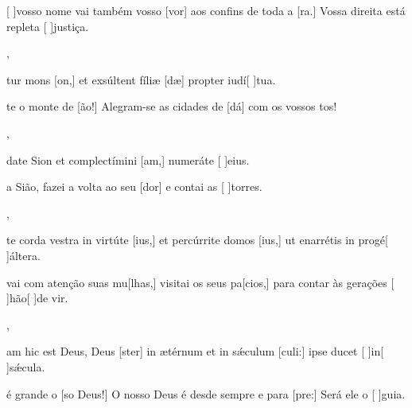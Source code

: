 {        {\item {}[ ]{vos}so nome vai também vosso [vor] aos confins de toda a [ra.] Vossa direita está repleta [ ]{jus}{ti}ça.},
    {\item {}tur mons [on,] et exsúltent fíliæ [dæ] propter iudí[ ]{tu}a.}%
        {\item {}te o monte de [ão!] Alegram-se as cida\-des de [dá] com os vossos tos!},
    {\item {}date Sion et complectímini [am,] numeráte [ ]{e}ius.}%
        {\item {} a Sião, fazei a volta ao seu [dor] e contai as [ ]{tor}res.},
    {\item {}te corda vestra in virtúte [ius,] et percúrrite domos [ius,] ut enarrétis in progé[ ]{ál}tera.}%
        {\item {}vai com atenção suas mu[lhas,] visitai os seus pa[cios,] para contar às gerações [ ]{hão}[ ]{de} vir.},
    {\item {}am hic est Deus, Deus [ster] in ætérnum et in sǽculum [culi:] ipse ducet [ ]{in}[ ]{sǽ}cula.}%
        {\item {} é grande o [so Deus!] O nosso Deus é desde sempre e para [pre:] Será ele o [ ]{gui}a.}
}